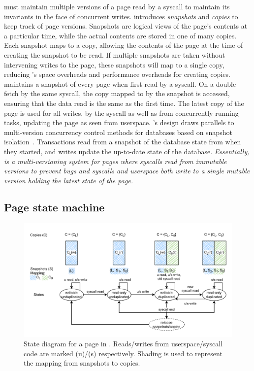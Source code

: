\documentclass[letterpaper,twocolumn,10pt, anonymous]{article}
\begin{document}
\tiktok must maintain multiple versions of a page read by a syscall 
to maintain its invariants in the face of concurrent writes.
\tiktok introduces \emph{snapshots} and \emph{copies} to keep track 
of page versions. 
Snapshots are logical views of the page's contents at a particular time,
while the actual contents are stored in one of many copies. 
Each snapshot maps to a copy, allowing the contents of the page at the 
time of creating the snapshot to be read. 
If multiple snapshots are taken without intervening writes to the page, 
these snapshots will map to a single copy, reducing \tiktok's space overheads 
and performance overheads for creating copies.
\tiktok maintains a snapshot of every page when first read by a syscall.
On a double fetch by the same syscall, the copy mapped to by the snapshot 
is accessed, ensuring that the data read is the same as the first time.
The latest copy of the page is used for all writes, by the syscall as 
well as from concurrently running tasks, updating the page as seen 
from userspace.
%
\tiktok's design draws parallels to multi-version concurrency control 
methods for databases based on snapshot isolation~\cite{0001MK15}.
Transactions read from a snapshot of the database state from when 
they started, and writes update the up-to-date state of the database.
%
\emph{Essentially, \tiktok is a multi-versioning system for pages where 
syscalls read from immutable versions to prevent \tocttou bugs and
syscalls and userspace both write to a single mutable version 
holding the latest state of the page.}

\subsection{Page state machine}

\begin{figure}[]
  \includegraphics[width=\linewidth]{img/tiktok_states.pdf}
  \caption{State diagram for a page in \tiktok. Reads/writes from userspace/syscall 
          code are marked (u)/(s) respectively. Shading is used to represent the 
          mapping from snapshots to copies.}
  \label{fig:tiktok_states}
\end{figure}
\end{document}
